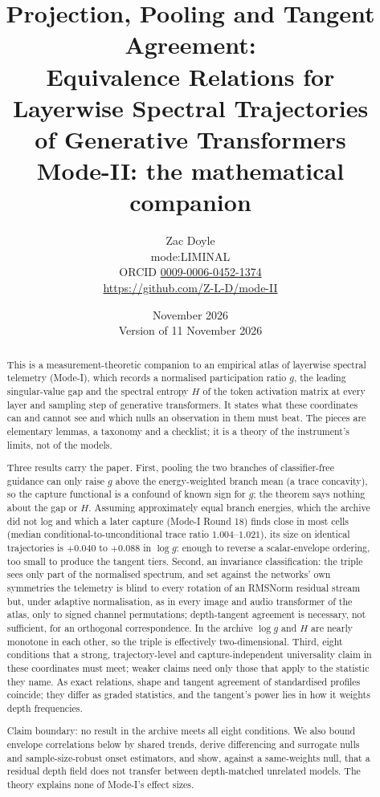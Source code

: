 \documentclass[11pt]{article}
\title{Projection, Pooling and Tangent Agreement:\\
Equivalence Relations for Layerwise Spectral Trajectories\\ of Generative Transformers\\[4pt]
\large Mode-II: the mathematical companion}
\author{Zac Doyle\\ \small mode:LIMINAL\\ \small ORCID \href{https://orcid.org/0009-0006-0452-1374}{0009-0006-0452-1374}\\ \small \url{https://github.com/Z-L-D/mode-II}}
\date{November 2026\\ \small Version of 11 November 2026}
\theoremstyle{definition}
\begin{document}
\maketitle

\begin{abstract}
This is a measurement-theoretic companion to an empirical atlas of layerwise spectral telemetry (Mode-I), which records a normalised participation ratio $g$, the leading singular-value gap and the spectral entropy $H$ of the token activation matrix at every layer and sampling step of generative transformers. It states what these coordinates can and cannot see and which nulls an observation in them must beat. The pieces are elementary lemmas, a taxonomy and a checklist; it is a theory of the instrument's limits, not of the models.

Three results carry the paper. First, pooling the two branches of classifier-free guidance can only raise $g$ above the energy-weighted branch mean (a trace concavity), so the capture functional is a confound of known sign for $g$; the theorem says nothing about the gap or $H$. Assuming approximately equal branch energies, which the archive did not log and which a later capture (Mode-I Round 18) finds close in most cells (median conditional-to-unconditional trace ratio $1.004$--$1.021$), its size on identical trajectories is $+0.040$ to $+0.088$ in $\log g$: enough to reverse a scalar-envelope ordering, too small to produce the tangent tiers. Second, an invariance classification: the triple sees only part of the normalised spectrum, and set against the networks' own symmetries the telemetry is blind to every rotation of an RMSNorm residual stream but, under adaptive normalisation, as in every image and audio transformer of the atlas, only to signed channel permutations; depth-tangent agreement is necessary, not sufficient, for an orthogonal correspondence. In the archive $\log g$ and $H$ are nearly monotone in each other, so the triple is effectively two-dimensional. Third, eight conditions that a strong, trajectory-level and capture-independent universality claim in these coordinates must meet; weaker claims need only those that apply to the statistic they name. As exact relations, shape and tangent agreement of standardised profiles coincide; they differ as graded statistics, and the tangent's power lies in how it weights depth frequencies.

Claim boundary: no result in the archive meets all eight conditions. We also bound envelope correlations below by shared trends, derive differencing and surrogate nulls and sample-size-robust onset estimators, and show, against a same-weights null, that a residual depth field does not transfer between depth-matched unrelated models. The theory explains none of Mode-I's effect sizes.
\end{abstract}
\end{document}
